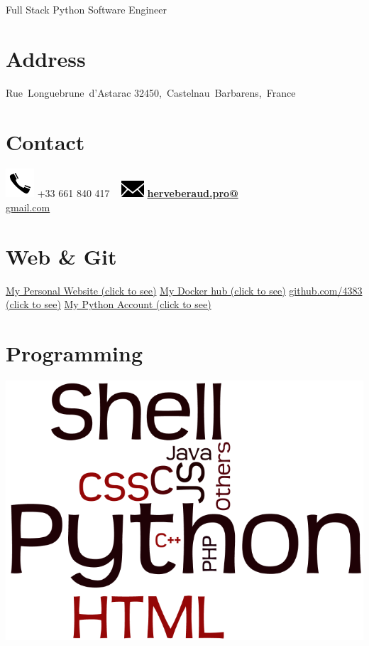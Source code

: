 \documentclass[]{friggeri-cv}
\begin{document}
    {Full Stack Python Software Engineer}
      

\begin{aside}
  \section{Address}
    Rue~Longuebrune~d'Astarac
    32450,~Castelnau~Barbarens,~France
    ~
  \section{Contact}
    \includegraphics[scale=0.50]{img/phone.png}
    +33 661 840 417
    ~
    \includegraphics[scale=0.50]{img/mail.png}
    \href{mailto:herveberaud.pro@gmail.com}{\textbf{herveberaud.pro@}\\gmail.com}
    ~
  \section{Web \& Git}
    \href{http://www.herve-beraud.ovh}{My Personal Website (click to see)}
	\href{https://hub.docker.com/r/4383}{My Docker hub (click to see)}
    \href{https://github.com/4383}{github.com/4383 (click to see)}
    \href{https://warehouse.python.org/user/4383/}{My Python Account (click to see)}
    ~
  \section{Programming}
    \includegraphics[scale=0.15]{img/programming.png}
    ~

\end{aside}
\end{document}
